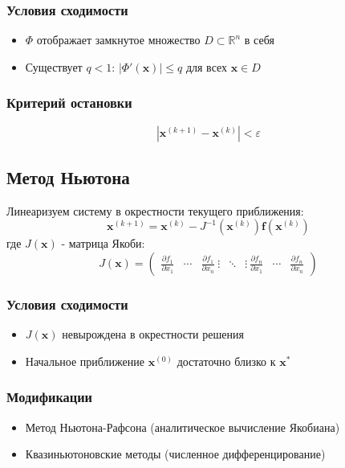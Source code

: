 \subsubsection*{Условия сходимости}
\begin{itemize}
\item $\Phi$ отображает замкнутое множество $D \subset \mathbb{R}^n$ в себя
\item Существует $q < 1$: $|\Phi'(\mathbf{x})| \leq q$ для всех $\mathbf{x} \in D$
\end{itemize}

\subsubsection*{Критерий остановки}
\begin{equation}
|\mathbf{x}^{(k+1)} - \mathbf{x}^{(k)}| < \varepsilon
\end{equation}

\subsection*{Метод Ньютона}

Линеаризуем систему в окрестности текущего приближения:
\begin{equation}
\mathbf{x}^{(k+1)} = \mathbf{x}^{(k)} - J^{-1}(\mathbf{x}^{(k)}) \mathbf{f}(\mathbf{x}^{(k)})
\end{equation}
где $J(\mathbf{x})$ - матрица Якоби:
\begin{equation}
J(\mathbf{x}) = \begin{pmatrix}
\frac{\partial f_1}{\partial x_1} & \cdots & \frac{\partial f_1}{\partial x_n} \
\vdots & \ddots & \vdots \
\frac{\partial f_n}{\partial x_1} & \cdots & \frac{\partial f_n}{\partial x_n}
\end{pmatrix}
\end{equation}

\subsubsection*{Условия сходимости}
\begin{itemize}
\item $J(\mathbf{x})$ невырождена в окрестности решения
\item Начальное приближение $\mathbf{x}^{(0)}$ достаточно близко к $\mathbf{x}^*$
\end{itemize}

\subsubsection*{Модификации}
\begin{itemize}
\item Метод Ньютона-Рафсона (аналитическое вычисление Якобиана)
\item Квазиньютоновские методы (численное дифференцирование)
\end{itemize}

